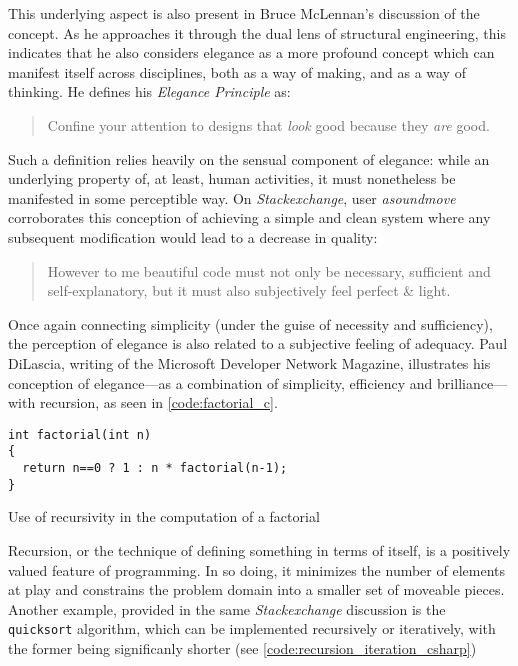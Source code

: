 This underlying aspect is also present in Bruce McLennan's discussion of the concept. As he approaches it through the dual lens of structural engineering, this indicates that he also considers elegance as a more profound concept which can manifest itself across disciplines, both as a way of making, and as a way of thinking\cite{mclennan_who_1997}. He defines his \emph{Elegance Principle} as:

\begin{quote}
  Confine your attention to designs that \emph{look} good because they \emph{are} good.\cite{mclennan_who_1997}
\end{quote}

Such a definition relies heavily on the sensual component of elegance: while an underlying property of, at least, human activities, it must nonetheless be manifested in some perceptible way. On \emph{Stackexchange}, user \emph{asoundmove} corroborates this conception of achieving a simple and clean system where any subsequent modification would lead to a decrease in quality:

\begin{quote}
  However to me beautiful code must not only be necessary, sufficient and self-explanatory, but it must also subjectively feel perfect \& light.\cite{stack_}
\end{quote}

Once again connecting simplicity (under the guise of necessity and sufficiency), the perception of elegance is also related to a subjective feeling of adequacy. Paul DiLascia, writing of the Microsoft Developer Network Magazine, illustrates his conception of elegance—as a combination of simplicity, efficiency and brilliance—with recursion\cite{dilascia_end_2019}, as seen in \ref{code:factorial_c}.

\begin{listing}
  \begin{verbatim}
int factorial(int n)
{
  return n==0 ? 1 : n * factorial(n-1);
}
\end{verbatim}
  \caption{Use of recursivity in the computation of a factorial}
  \label{code:factorial_c}
\end{listing}

Recursion, or the technique of defining something in terms of itself, is a positively valued feature of programming\cite{abelson_structure_1979}. In so doing, it minimizes the number of elements at play and constrains the problem domain into a smaller set of moveable pieces. Another example, provided in the same \emph{Stackexchange} discussion is the \lstinline{quicksort} algorithm, which can be implemented recursively or iteratively, with the former being significanly shorter (see \ref{code:recursion_iteration_csharp})

